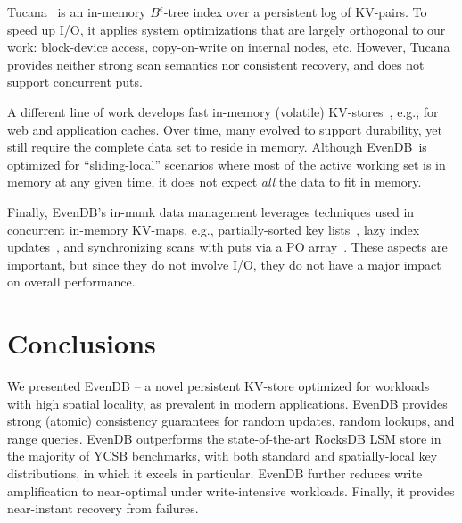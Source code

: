 \documentclass[sigplan,10pt]{acmart}
\newcommand{\sys}{EvenDB}
\begin{document}
Tucana~\cite{tucana} is an in-memory $B^{\epsilon}$-tree index over a persistent log of KV-pairs. To speed up I/O, it
applies  system optimizations that are largely orthogonal to our work: block-device  access, copy-on-write on internal nodes, etc. However, Tucana provides neither strong scan semantics nor consistent recovery, and does not support concurrent puts.

A different line of work develops fast
in-memory (volatile) KV-stores~\cite{ignite, redis, memcached, Srinivasan:2016:AAR:3007263.3007276}, 
e.g., for web and application caches. Over time, many evolved to support durability,
yet still require the complete data set to reside in memory.
Although \sys\ is optimized for ``sliding-local'' scenarios where most of the active working set is in memory at any given time, it does not expect \emph{all} the data to fit in memory. 

Finally, \sys's in-munk data management leverages techniques used in concurrent in-memory KV-maps, e.g., partially-sorted 
key lists~\cite{Wu:2019:WFO:3302424.3303955,kiwi}, lazy index updates~\cite{kiwi,tdls}, 
and synchronizing scans with puts via a PO array~\cite{kiwi}. These aspects are important, but since they do not involve I/O, they do not have a major impact on overall performance.


\section{Conclusions}
\label{sec:conclusions}
We presented \sys\/ -- a novel persistent KV-store optimized for workloads with high spatial locality, as prevalent in modern %
applications. \sys\/ provides strong (atomic) consistency guarantees for random updates, random lookups, and range queries. 
\sys\/ outperforms the state-of-the-art RocksDB LSM store  in the  majority of YCSB benchmarks, with both 
standard and spatially-local key distributions, in which it excels in particular. \sys\/ further reduces write amplification to near-optimal under write-intensive 
workloads. Finally, it provides near-instant recovery from failures.
\end{document}

